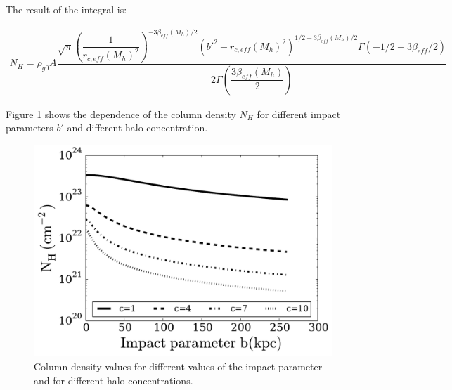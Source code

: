 \documentclass[a4,useAMS,usenatbib,usegraphicx]{mn2e}
\begin{document}
The result of the integral is:

\begin{equation}\label{eq:NH}
\begin{split}
N_{H} = \rho_{g0} A\dfrac{\sqrt{\pi} (\dfrac{1}{r_{c,eff}(M_h)^2})^{-3\beta_{eff}(M_h) /2} (b'^2 + r_{c,eff}(M_h)^2)^{1/2 - 3\beta_{eff}(M_h)/2} \Gamma(-1/2 + 3\beta_{eff}/2) }{2 \Gamma(\dfrac{3\beta_{eff}(M_h)}{2})}
\end{split}
\end{equation}


Figure \ref{fig:NHb} shows the dependence of the column density $N_H$
for different impact parameters $b'$ and different halo concentration.
\begin{figure}
\centering
\includegraphics[scale=0.5]{../figures/NH-b.pdf}
\caption{Column density values for different values of the impact
parameter and for different halo concentrations.\label{fig:NHb}}
\end{figure}



\end{document}
